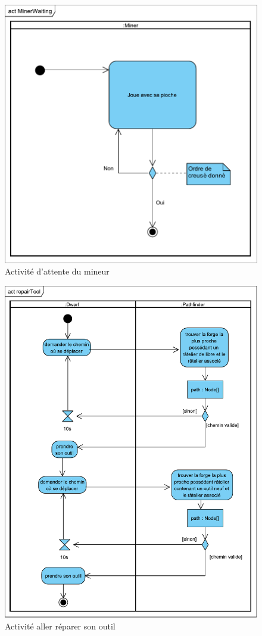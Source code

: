 \documentclass[a4paper]{report}
\begin{document}
\begin{figure}[H]
    \center
    \includegraphics[width=15cm]{img/act/MinerWaiting}
    \caption{Activité d'attente du mineur}
		\label{}
\end{figure}


\begin{figure}[H]
    \center
    \includegraphics[width=15cm]{img/act/repairTool}
    \caption{Activité aller réparer son outil}
		\label{}
\end{figure}
\end{document}

